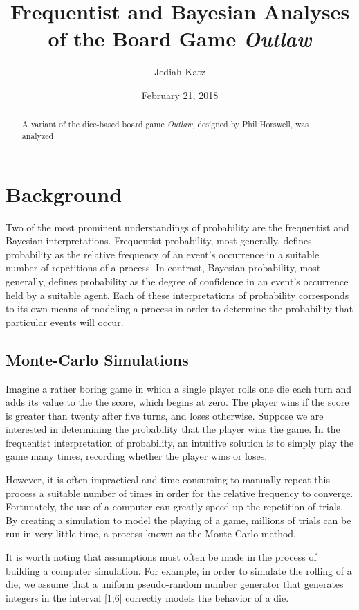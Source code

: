\documentclass{article}
\title{Frequentist and Bayesian Analyses of the Board Game \textit{Outlaw}}
\author{Jediah Katz}
\date{February 21, 2018}
\theoremstyle{definition}
\theoremstyle{plain}
\begin{document}
	\maketitle
	\begin{abstract}
		A variant of the dice-based board game \textit{Outlaw}, designed by Phil Horswell, was analyzed 
	\end{abstract}

	\section{Background}
	Two of the most prominent understandings of probability are the frequentist and Bayesian interpretations. Frequentist probability, most generally, defines probability as the relative frequency of an event's occurrence in a suitable number of repetitions of a process. In contrast, Bayesian probability, most generally, defines probability as the degree of confidence in an event's occurrence held by a suitable agent. Each of these interpretations of probability corresponds to its own means of modeling a process in order to determine the probability that particular events will occur.
	
	\subsection{Monte-Carlo Simulations}
	Imagine a rather boring game in which a single player rolls one die each turn and adds its value to the the score, which begins at zero. The player wins if the score is greater than twenty after five turns, and loses otherwise. Suppose we are interested in determining the probability that the player wins the game. In the frequentist interpretation of probability, an intuitive solution is to simply play the game many times, recording whether the player wins or loses.
	
	However, it is often impractical and time-consuming to manually repeat this process a suitable number of times in order for the relative frequency to converge. Fortunately, the use of a computer can greatly speed up the repetition of trials. By creating a simulation to model the playing of a game, millions of trials can be run in very little time, a process known as the Monte-Carlo method. 
	
	It is worth noting that assumptions must often be made in the process of building a computer simulation. For example, in order to simulate the rolling of a die, we assume that a uniform pseudo-random number generator that generates integers in the interval {[1,6]} correctly models the behavior of a die.
	
\end{document}

